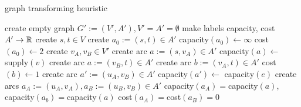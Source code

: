 \begin{algorithm}
 \caption{graph transforming heuristic}
 \label{algo:graphtransform}
 \begin{algorithmic}[5]
  \State create empty graph $G':=(V',A'), V'=A'=\emptyset$
  \State make labels capacity, cost $A'\to \mathbb{R}$%
  \State create $s, t\in V$ 
  \State create $a_0 :=(s,t) \in A'$
  \State capacity$(a_0)\gets\infty$ 
  \State cost$(a_0)\gets 2$ 
    \State create $v_A, v_B\in V'$
      \State create arc $a:=(s,v_A)\in A'$
      \State capacity$(a)\gets$ supply$(v)$
      \State create arc $a:=(v_B, t)\in A'$
      \State create arc $b:=(v_A,t)\in A'$
      \State cost$(b)\gets 1$
    \EndIf
  \EndFor
      \State create arc $a':=(u_A, v_B)\in A'$
      \State capacity$(a')\gets$ capacity$(e)$
    \Else
      \State create arcs $a_A:=(u_A, v_A), a_B:=(u_B, v_B)\in A'$
      \State capacity$(a_A)=$capacity$(a)$, capacity$(a_b)=$capacity$(a)$
      \State cost$(a_A)=$cost$(a_B)=0$
    \EndIf
  \EndFor
  \EndFunction
 \end{algorithmic}

\end{algorithm}




